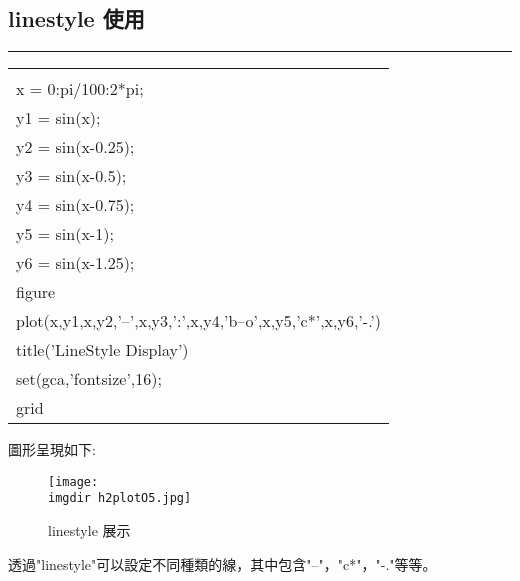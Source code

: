 		\subsection{linestyle 使用}%
		\rule{\textwidth}{0.2pt}
		\begin{center}\colorbox{slight}{
				\begin{tabular}{p{}}
					\MJHmarker{\textbf{MATLAB語法 :}}\\					
					x = 0:pi/100:2*pi;\\
					y1 = sin(x);\\
					y2 = sin(x-0.25);\\
					y3 = sin(x-0.5);\\
					y4 = sin(x-0.75);\\
					y5 = sin(x-1);\\
					y6 = sin(x-1.25);\\
					figure\\
					plot(x,y1,x,y2,'--',x,y3,':',x,y4,'b--o',x,y5,'c*',x,y6,'-.')\\
					title('LineStyle Display')\\
					set(gca,'fontsize',16);\\
					grid\\
				\end{tabular}
			}
			\end{center}
		圖形呈現如下:
		\begin{figure}[H]	
		 	 \centering	 			 	 
   			 \texttt{[image: \\imgdir h2plotO5.jpg]} 
   			 \caption{linestyle 展示} 	
   			 \label{h2plotO5}   			 		 
		\end{figure}
		透過"linestyle"可以設定不同種類的線，其中包含"--"，"c*"，"-."等等。
